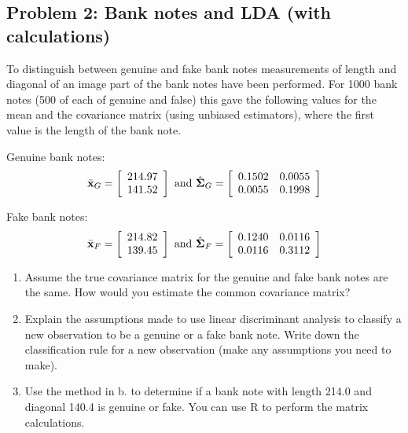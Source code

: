 \documentclass[]{article}
\begin{document}
\subsection{Problem 2: Bank notes and LDA (with
calculations)}\label{problem-2-bank-notes-and-lda-with-calculations}

To distinguish between genuine and fake bank notes measurements of
length and diagonal of an image part of the bank notes have been
performed. For 1000 bank notes (500 of each of genuine and false) this
gave the following values for the mean and the covariance matrix (using
unbiased estimators), where the first value is the length of the bank
note.

Genuine bank notes: \[
   \bar{\bf x}_G=\left[     \begin{array}{c} 214.97 \\ 141.52  \end{array} \right]
\text{ and }
   \hat{\boldsymbol \Sigma}_G=\left[     \begin{array}{cc} 0.1502 & 0.0055 \\ 0.0055 & 0.1998 
\end{array} \right]
\]

Fake bank notes: \[
   \bar{\bf x}_F= \left[     \begin{array}{c} 214.82 \\ 139.45  \end{array} \right]
\text{ and }
   \hat{\boldsymbol \Sigma}_F= \left[     \begin{array}{cc} 0.1240 & 0.0116 \\ 0.0116 & 0.3112 
\end{array} \right]
\]

\begin{enumerate}
\def\labelenumi{\alph{enumi}.}
\item
  Assume the true covariance matrix for the genuine and fake bank notes
  are the same. How would you estimate the common covariance matrix?
\item
  Explain the assumptions made to use linear discriminant analysis to
  classify a new observation to be a genuine or a fake bank note. Write
  down the classification rule for a new observation (make any
  assumptions you need to make).
\item
  Use the method in b. to determine if a bank note with length 214.0 and
  diagonal 140.4 is genuine or fake. You can use R to perform the matrix
  calculations.
\end{enumerate}
\end{document}
